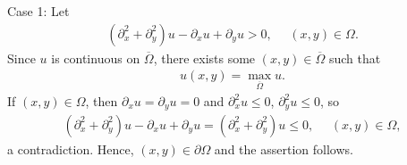 \begin{questions}
\begin{solution}
Case 1: Let
\begin{align*}
(\partial_x^2+\partial_y^2)u-\partial_xu+\partial_yu> 0,~~~~~~(x,y)\in\Omega.
\end{align*}
Since $u$ is continuous on $\overline{\Omega}$, there exists some $(x,y)\in\overline{\Omega}$ such that
\begin{align*}
u(x,y)=\max_{\overline{\Omega}}u.
\end{align*}
If $(x,y)\in\Omega$, then $\partial_xu=\partial_yu=0$ and $\partial^2_xu\leq 0$, $\partial^2_yu\leq 0$, so
\begin{align*}
(\partial_x^2+\partial_y^2)u-\partial_xu+\partial_yu=(\partial_x^2+\partial_y^2)u\leq 0 ,~~~~~~(x,y)\in\Omega,
\end{align*}
a contradiction. Hence, $(x,y)\in\partial\Omega$ and the assertion follows.


\end{solution}
\end{questions}
